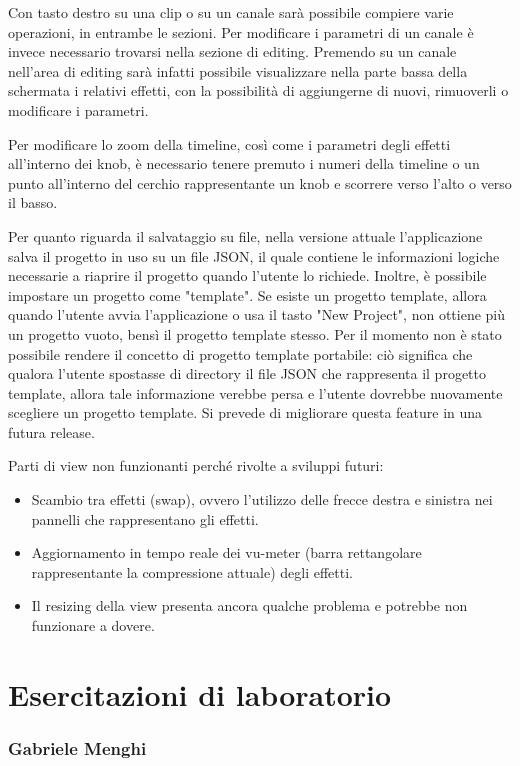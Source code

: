 \documentclass[a4paper,12pt]{report}
\begin{document}
Con tasto destro su una clip o su un canale sarà possibile compiere varie operazioni, in entrambe le sezioni. Per modificare i parametri di un canale è invece necessario trovarsi nella sezione di editing. Premendo su un canale nell’area di editing sarà infatti possibile visualizzare nella parte bassa della schermata i relativi effetti, con la possibilità di aggiungerne di nuovi, rimuoverli o modificare i parametri. 

Per modificare lo zoom della timeline, così come i parametri degli effetti all’interno dei knob, è necessario tenere premuto i numeri della timeline o un punto all’interno del cerchio rappresentante un knob e scorrere verso l’alto o verso il basso.

Per quanto riguarda il salvataggio su file, nella versione attuale l'applicazione salva il progetto in uso su un file JSON, il quale contiene le informazioni logiche necessarie a riaprire il progetto quando l'utente lo richiede. Inoltre, è possibile impostare un progetto come "template". Se esiste un progetto template, allora quando l'utente avvia l'applicazione o usa il tasto "New Project", non ottiene più un progetto vuoto, bensì il progetto template stesso. Per il momento non è stato possibile rendere il concetto di progetto template portabile: ciò significa che qualora l'utente spostasse di directory il file JSON che rappresenta il progetto template, allora tale informazione verebbe persa e l'utente dovrebbe nuovamente scegliere un progetto template. Si prevede di migliorare questa feature in una futura release. 

Parti di view non funzionanti perché rivolte a sviluppi futuri:
\begin{itemize}
    \item Scambio tra effetti (swap), ovvero l'utilizzo delle frecce destra e sinistra nei pannelli che rappresentano gli effetti.
    \item Aggiornamento in tempo reale dei vu-meter (barra rettangolare rappresentante la compressione attuale) degli effetti.
    \item Il resizing della view presenta ancora qualche problema e potrebbe non funzionare a dovere. 
\end{itemize}

\chapter{Esercitazioni di laboratorio}

\subsection{Gabriele Menghi}
\end{document}
